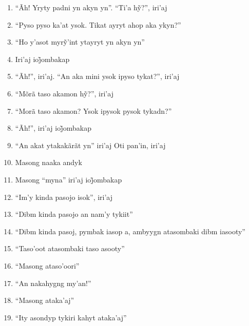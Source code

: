 \begin{enumerate}
 \item ``Ãh! Yryty padni yn akyn yn''. ``Ti’a hỹ?'', iri’aj

 \item ``Pyso pyso ka'at ysok. Tikat ayryt ahop aka ykyn?''

 \item ``Ho y’asot myrỹ’int ytayryt yn akyn yn''

 \item Iri’aj ioj̃ombakap

 \begin{center}\end{center}

 \item ``Ãh!'', iri'aj. ``An aka mini ysok ipyso tykat?'', iri'aj

 \item ``Mõrã taso akamon hỹ?'', iri’aj

 \item ``Morã taso akamon? Ysok ipysok pysok tykadn?''

 \item ``Ãh!'', iri’aj ioj̃ombakap

 \item ``An akat ytakakãrãt yn'' iri'aj Oti pan'in, iri'aj

 \item Masong naaka andyk

 \begin{center}\end{center}

 \item Masong ``myna'' iri’aj ioj̃ombakap

 \item ``Im'y kinda pasojo isok'', iri'aj

 \item ``Dibm kinda pasojo an nam'y tykiit''

 \item ``Dibm kinda pasoj, pymbak iasop a, ambyygn atasombaki dibm iasooty''

 \item ``Taso'oot atasombaki taso asooty''

 \item ``Masong ataso'oori''

 \item ``An nakahygng my'an!''

 \item ``Masong ataka'aj''

 \item ``Ity asondyp tykiri kahyt ataka'aj''


\end{enumerate}
